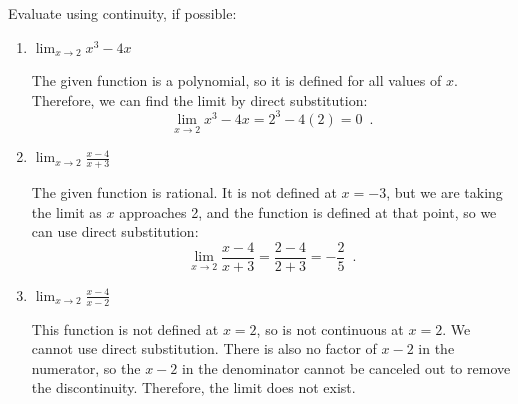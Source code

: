 \begin{example}
Evaluate using continuity, if possible:
    \begin{enumerate}[label=(\alph*)]
    \item $\displaystyle\lim_{x\to 2}x^3-4x$

    \begin{solution} The given function is a polynomial, so it is defined for all values of $x$. Therefore, we can find the limit by direct substitution:
    $$\lim_{x\to 2}x^3-4x = 2^3-4(2) = 0 \enspace.$$
    \end{solution}
    \item $\displaystyle\lim_{x\to 2}\frac{x-4}{x+3}$

    \begin{solution} 
    The given function is rational. It is not defined at $x = -3$, but we are taking the limit as $x$ approaches 2, and the function is defined at that point, so we can use direct substitution:
    $$\lim_{x\to 2}\frac{x-4}{x+3} = \frac{2-4}{2+3}=-\frac{2}{5} \enspace .$$
    \end{solution}
    \item $\displaystyle\lim_{x\to 2} \frac{x-4}{x-2}$

    \begin{solution} 
    This function is not defined at $x = 2$, so is not continuous at $x = 2$. We cannot use direct substitution. There is also no factor of $x-2$ in the numerator, so the $x-2$ in the denominator cannot be canceled out to remove the discontinuity. Therefore, the limit does not exist.
    \end{solution}
\end{enumerate}
\end{example}
